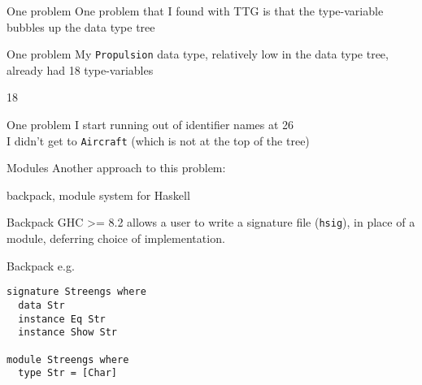 \begin{frame}[fragile]
\begin{block}{One problem}
One problem that I found with TTG is that the type-variable bubbles up the data type tree
\end{block}
\end{frame}

\begin{frame}[fragile]
\begin{block}{One problem}
My \lstinline{Propulsion} data type, relatively low in the data type tree, already had 18 type-variables
\end{block}
\end{frame}

\begin{frame}[fragile]
\begin{center}
\huge{18}
\end{center}
\end{frame}

\begin{frame}[fragile]
\begin{block}{One problem}
I start running out of identifier names at 26
\\[13pt]
I didn't get to \lstinline{Aircraft} \tiny{(which is not at the top of the tree)}
\end{block}
\end{frame}

\begin{frame}[fragile]
\begin{block}{Modules}
Another approach to this problem:

backpack, module system for Haskell
\end{block}
\end{frame}

\begin{frame}[fragile]
\begin{block}{Backpack}
GHC >= 8.2 allows a user to write a signature file (\lstinline{hsig}), in place
of a module, deferring choice of implementation.
\end{block}
\end{frame}

\begin{frame}[fragile]
\begin{block}{Backpack e.g.}
\begin{lstlisting}[style=haskell]
signature Streengs where
  data Str
  instance Eq Str
  instance Show Str

module Streengs where
  type Str = [Char]
\end{lstlisting}
\end{block}
\end{frame}

